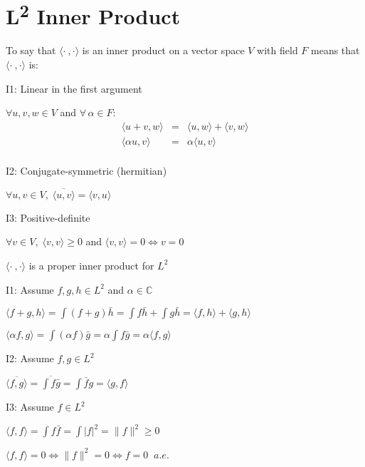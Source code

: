 \documentclass[letterpaper,12pt,fleqn]{article}
\newcommand{\abs}[1]{\left|#1\right|}
\newcommand{\norm}[1]{\lVert#1\rVert}
\newcommand{\inner}[2]{\langle#1,#2\rangle}
\newcommand{\conj}[1]{\bar{#1}}
\newcommand{\Conj}[1]{\overline{#1}}
\begin{document}
\section*{L\textsuperscript2 Inner Product}

\begin{definition}
To say that $\inner{\cdot\:}{\cdot}$ is an inner product on a vector space $V$
with field $F$ means that $\inner{\cdot\:}{\cdot}$ is:
\begin{description}
\item{I1: Linear in the first argument}

$\forall u,v,w\in V$ and $\forall\,\alpha\in F$:
\[\begin{array}{rcl}
\inner{u+v}{w} &=& \inner{u}{w}+\inner{v}{w} \\
\inner{\alpha u}{v} &=& \alpha\inner{u}{v} \\
\end{array}\]

\item{I2: Conjugate-symmetric (hermitian)}

$\forall u,v\in V,\;\Conj{\inner{u}{v}}=\inner{v}{u}$

\item{I3: Positive-definite}

$\forall v\in V,\;\inner{v}{v}\ge0$ and $\inner{v}{v}=0\iff v=0$

\end{description}
\end{definition}

\begin{theorem}
$\inner{\cdot\:}{\cdot}$ is a proper inner product for $L^2$
\end{theorem}

\begin{theproof}
\listbreak
\begin{description}
\item{I1: Assume $f,g,h\in L^2$ and $\alpha\in\mathbb{C}$}

$\inner{f+g}{h}=\int(f+g)\conj{h}=\int f\conj{h}+\int g\conj{h}=
    \inner{f}{h}+\inner{g}{h}$

$\inner{\alpha f}{g}=\int(\alpha f)\conj{g}=\alpha\int f\conj{g}=
    \alpha\inner{f}{g}$

\item{I2: Assume $f,g\in L^2$}

$\Conj{\inner{f}{g}}=\Conj{\int f\conj{g}}=\int\conj{f}g=\inner{g}{f}$

\item{I3: Assume $f\in L^2$}

$\inner{f}{f}=\int f\conj{f}=\int\abs{f}^2=\norm{f}^2\ge0$

$\inner{f}{f}=0\iff\norm{f}^2=0\iff f=0\;\;a.e.$
\end{description}
\end{theproof}
\end{document}
